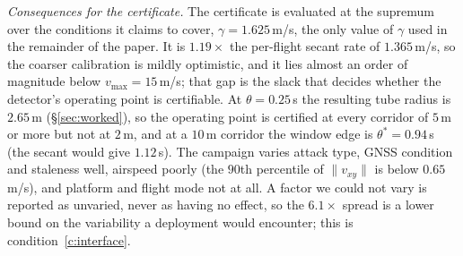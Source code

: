 \begin{table}[t]
\centering
\caption{Per-flight rates $\gamma$: the coarse calibration obtained from a
single scalar per flight. The $2.6\times$ spread across attack types is visible
here; the finer structure requires Table~\ref{tab:gammacamp}. Generated by
.}
\label{tab:gamma}
\small
\renewcommand{\arraystretch}{1.05}

\end{table}

\emph{Consequences for the certificate.} The certificate is evaluated at the
supremum over the conditions it claims to cover, $\gamma=1.625$\,m/s, the only
value of $\gamma$ used in the remainder of the paper. It is $1.19\times$ the
per-flight secant rate of $1.365$\,m/s, so the coarser calibration is mildly
optimistic, and it lies almost an order of magnitude below
$v_{\max}=15$\,m/s; that gap is the slack that decides whether the detector's
operating point is certifiable. At $\theta=0.25$\,s the resulting tube radius is
$2.65$\,m (\S\ref{sec:worked}), so the operating point is certified at every
corridor of $5$\,m or more but not at $2$\,m, and at a $10$\,m corridor the
window edge is $\theta^{*}=0.94$\,s (the secant would give $1.12$\,s). The
campaign varies attack type, GNSS condition and staleness well, airspeed poorly
(the $90$th percentile of $\lVert v_{xy}\rVert$ is below $0.65$\,m/s), and
platform and flight mode not at all. A factor we could not vary is reported as
unvaried, never as having no effect, so the $6.1\times$ spread is a lower bound
on the variability a deployment would encounter; this is
condition~\ref{c:interface}.

